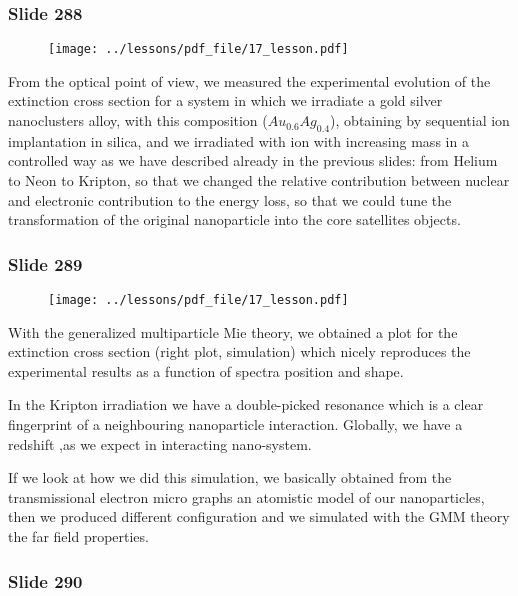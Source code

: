 \documentclass[../main/main.tex]{subfiles}
\begin{document}
\subsubsection{Slide 288}

\begin{figure}[h!]
\centering
\texttt{[image: ../lessons/pdf\_file/17\_lesson.pdf]}
\end{figure}

From the optical point of view, we measured the experimental evolution of the extinction cross section for a system in which we irradiate a gold silver nanoclusters alloy, with this composition (\( Au_{0.6} Ag_{0.4} \)), obtaining by sequential ion implantation in silica, and we irradiated with ion with increasing mass in a controlled way as we have described already in the previous slides: from Helium to Neon to Kripton, so that we changed the relative contribution between nuclear and electronic contribution to the energy loss, so that we could tune the transformation of the original nanoparticle into the core satellites objects.

\newpage

\subsubsection{Slide 289}

\begin{figure}[h!]
\centering
\texttt{[image: ../lessons/pdf\_file/17\_lesson.pdf]}
\end{figure}

With the generalized multiparticle Mie theory, we obtained a plot for the extinction cross section (right plot, simulation) which nicely reproduces the experimental results as a function of spectra position and shape.

In the Kripton irradiation we have a double-picked resonance which is a clear fingerprint of a neighbouring nanoparticle interaction. Globally, we have a redshift ,as we expect in interacting nano-system.

If we look at how we did this simulation, we basically obtained from the transmissional electron micro graphs an atomistic model of our nanoparticles, then we produced different configuration and we simulated with the GMM theory the far field properties.


\newpage

\subsubsection{Slide 290}
\end{document}
